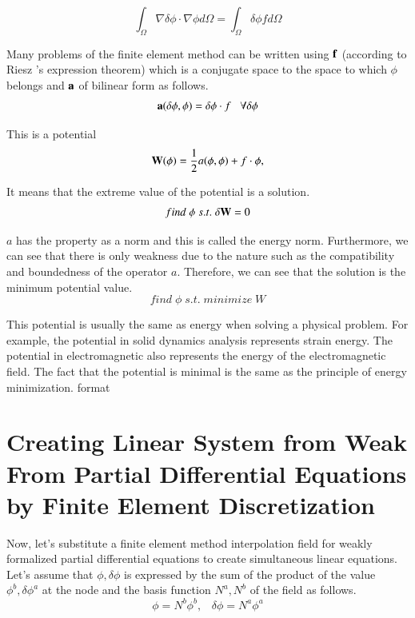 \begin{equation}
\int_{\Omega} \nabla\delta\phi\cdot\nabla\phi d\Omega = \int_{\Omega}\delta\phi f d\Omega
\end{equation}


Many problems of the finite element method can be written using $\mathbf{f}$ (according to Riesz 's expression theorem) which is a conjugate space to the space to which $\phi$ belongs and $\mathbf{a}$ of bilinear form as follows.
\begin{equation}
\mathbf{a}(\delta\phi,\phi)=\delta\phi\cdot f\;\;\;\forall \delta\phi
\end{equation}

This is a potential
\begin{equation}
\mathbf{W}(\phi)=\frac{1}{2}a(\phi,\phi)+f\cdot\phi,
\end{equation}

It means that the extreme value of the potential is a solution.
\begin{equation}
find\;\phi\;s.t.\;\delta\mathbf{W}=0
\end{equation}

$a$ has the property as a norm and this is called the energy norm. Furthermore, we can see that there is only weakness due to the nature such as the compatibility and boundedness of the operator $a$. 
%
Therefore, we can see that the solution is the minimum potential value.
%
\begin{equation}
find\;\phi\;s.t.\;minimize\; W
\end{equation}

This potential is usually the same as energy when solving a physical problem. For example, the potential in solid dynamics analysis represents strain energy. The potential in electromagnetic also represents the energy of the electromagnetic field. The fact that the potential is minimal is the same as the principle of energy minimization. format





\section{Creating Linear System from Weak From Partial Differential Equations by Finite Element Discretization}
%
Now, let's substitute a finite element method interpolation field for weakly formalized partial differential equations to create simultaneous linear equations. 
%
Let's assume that $\phi,\delta\phi$ is expressed by the sum of the product of the value $\phi^b,\delta\phi^a$ at the node and the basis function $N^a,N^b$ of the field as follows.
%
\begin{equation}
\phi = N^b\phi^b,\;\;\;\delta\phi = N^a\phi^a
\end{equation}

